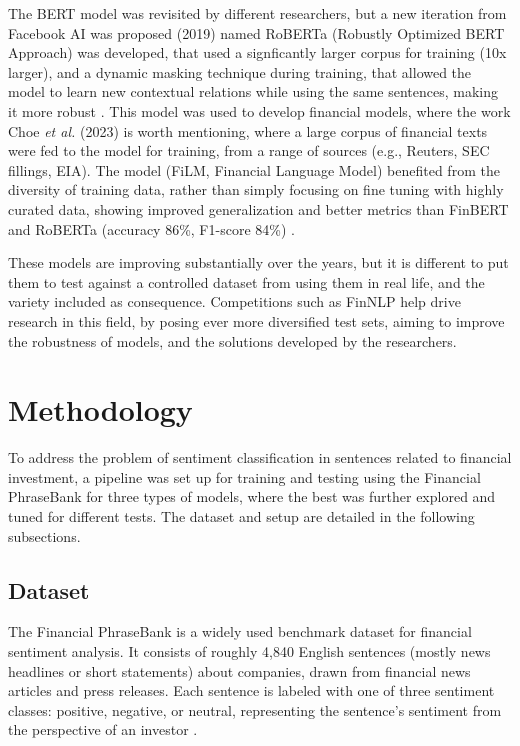 \documentclass[conference]{IEEEtran}
\begin{document}
The BERT model was revisited by different researchers, but a new iteration from Facebook AI was proposed (2019) named RoBERTa (Robustly Optimized BERT Approach) was developed, that used a signficantly larger corpus for training (10x larger), and a dynamic masking technique during training, that allowed the model to learn new contextual relations while using the same sentences, making it more robust \cite{liu2019roberta}. This model was used to develop financial models, where the work Choe \textit{et al.} (2023) is worth mentioning, where a large corpus of financial texts were fed to the model for training, from a range of sources (e.g., Reuters, SEC fillings, EIA). The model (FiLM, Financial Language Model) benefited from the diversity of training data, rather than simply focusing on fine tuning with highly curated data, showing improved generalization and better metrics than FinBERT and RoBERTa (accuracy 86\%, F1-score 84\%) \cite{choe2023exploring}.

These models are improving substantially over the years, but it is different to put them to test against a controlled dataset from using them in real life, and the variety included as consequence. Competitions such as FinNLP help drive research in this field, by posing ever more diversified test sets, aiming to improve the robustness of models, and the solutions developed by the researchers.


\section{Methodology}

To address the problem of sentiment classification in sentences related to financial investment, a pipeline was set up for training and testing using the Financial PhraseBank for three types of models, where the best was further explored and tuned for different tests. The dataset and setup are detailed in the following subsections.

\subsection{Dataset}

The Financial PhraseBank is a widely used benchmark dataset for financial sentiment analysis. It consists of roughly 4,840 English sentences (mostly news headlines or short statements) about companies, drawn from financial news articles and press releases. Each sentence is labeled with one of three sentiment classes: positive, negative, or neutral, representing the sentence’s sentiment from the perspective of an investor \cite{dataset, malo2014good}.
\end{document}
